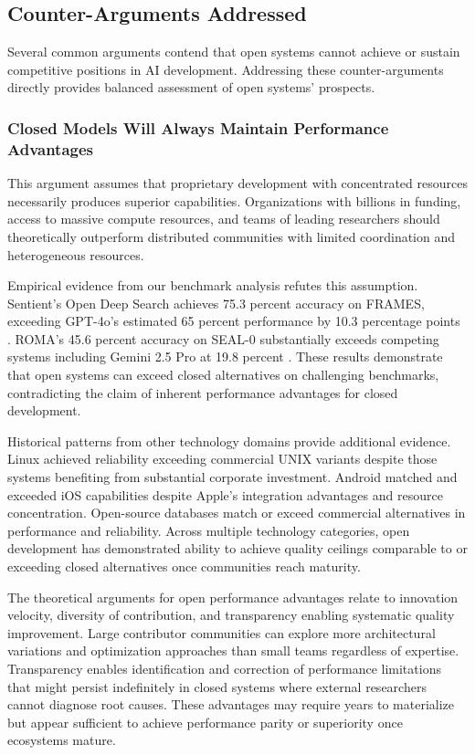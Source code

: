 \subsection{Counter-Arguments Addressed}

Several common arguments contend that open systems cannot achieve or sustain competitive positions in AI development. Addressing these counter-arguments directly provides balanced assessment of open systems' prospects.

\subsubsection{Closed Models Will Always Maintain Performance Advantages}

This argument assumes that proprietary development with concentrated resources necessarily produces superior capabilities. Organizations with billions in funding, access to massive compute resources, and teams of leading researchers should theoretically outperform distributed communities with limited coordination and heterogeneous resources.

Empirical evidence from our benchmark analysis refutes this assumption. Sentient's Open Deep Search achieves 75.3 percent accuracy on FRAMES, exceeding GPT-4o's estimated 65 percent performance by 10.3 percentage points \cite{ods_github2025}. ROMA's 45.6 percent accuracy on SEAL-0 substantially exceeds competing systems including Gemini 2.5 Pro at 19.8 percent \cite{roma_twitter2025}. These results demonstrate that open systems can exceed closed alternatives on challenging benchmarks, contradicting the claim of inherent performance advantages for closed development.

Historical patterns from other technology domains provide additional evidence. Linux achieved reliability exceeding commercial UNIX variants despite those systems benefiting from substantial corporate investment. Android matched and exceeded iOS capabilities despite Apple's integration advantages and resource concentration. Open-source databases match or exceed commercial alternatives in performance and reliability. Across multiple technology categories, open development has demonstrated ability to achieve quality ceilings comparable to or exceeding closed alternatives once communities reach maturity.

The theoretical arguments for open performance advantages relate to innovation velocity, diversity of contribution, and transparency enabling systematic quality improvement. Large contributor communities can explore more architectural variations and optimization approaches than small teams regardless of expertise. Transparency enables identification and correction of performance limitations that might persist indefinitely in closed systems where external researchers cannot diagnose root causes. These advantages may require years to materialize but appear sufficient to achieve performance parity or superiority once ecosystems mature.

